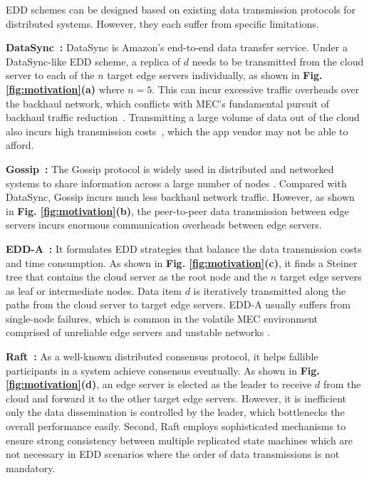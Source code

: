 \documentclass[10pt,journal,compsoc]{IEEEtran}
\begin{document}
EDD schemes can be designed based on existing data transmission protocols for distributed systems. However, they each suffer from specific limitations.

\smallskip
\textbf{DataSync~\cite{datasync2018AWS}:} DataSync is Amazon's end-to-end data transfer service. Under a DataSync-like EDD scheme, a replica of $d$ needs to be transmitted from the cloud server to each of the $n$ target edge servers individually, as shown in \textbf{Fig. \ref{fig:motivation}(a)} where $n = 5$. This can incur excessive traffic overheads over the backhaul network, which conflicts with MEC's fundamental pursuit of backhaul traffic reduction~\cite{li2020Auditing}. Transmitting a large volume of data out of the cloud also incurs high transmission costs~\cite{xia2021cost}, which the app vendor may not be able to afford.



\smallskip
\textbf{Gossip~\cite{boyd2006randomized}:} The Gossip protocol is widely used in distributed and networked systems to share information across a large number of nodes \cite{boyd2006randomized}. Compared with DataSync, Gossip incurs much less backhaul network traffic. However, as shown in \textbf{Fig. \ref{fig:motivation}(b)}, the peer-to-peer data transmission between edge servers incurs enormous communication overheads between edge servers. 

\smallskip
\textbf{EDD-A~\cite{xia2021cost}:} It formulates EDD strategies that balance the data transmission costs and time consumption. As shown in \textbf{Fig. \ref{fig:motivation}(c)}, it finds a Steiner tree that contains the cloud server as the root node and the $n$ target edge servers as leaf or intermediate nodes. Data item $d$ is iteratively transmitted along the paths from the cloud server to target edge servers. EDD-A usually suffers from single-node failures, which is common in the volatile MEC environment comprised of unreliable edge servers and unstable networks \cite{yuan2021CoopEdge}.

\smallskip
\textbf{Raft~\cite{ongaro2014Raft}:} As a well-known distributed consensus protocol, it helps fallible participants in a system achieve consensus eventually. As shown in \textbf{Fig. \ref{fig:motivation}(d)}, an edge server is elected as the leader to receive $d$ from the cloud and forward it to the other target edge servers. However, it is inefficient only the data dissemination is controlled by the leader, which bottlenecks the overall performance easily. Second, Raft employs sophisticated mechanisms to ensure strong consistency between multiple replicated state machines which are not necessary in EDD scenarios where the order of data transmissions is not mandatory.
\end{document}
